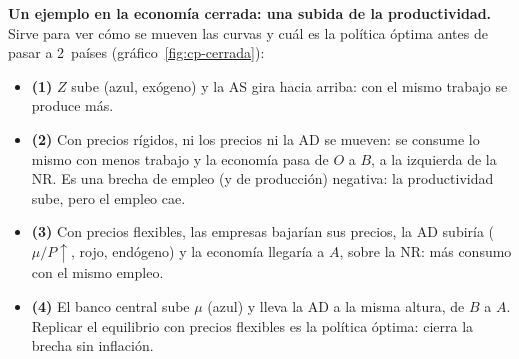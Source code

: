 \documentclass[11pt]{article}
\begin{document}
\begin{anotaciones}
\textbf{Un ejemplo en la economía cerrada: una subida de la productividad.} Sirve para ver cómo se mueven las curvas y cuál es la política óptima antes de pasar a 2~países (gráfico~\ref{fig:cp-cerrada}):
\begin{itemize}
\item \textbf{(1)} $Z$ sube (azul, exógeno) y la AS gira hacia arriba: con el mismo trabajo se produce más.
\item \textbf{(2)} Con precios rígidos, ni los precios ni la AD se mueven: se consume lo mismo con menos trabajo y la economía pasa de $O$ a $B$, a la izquierda de la NR. Es una brecha de empleo (y de producción) negativa: la productividad sube, pero el empleo cae.
\item \textbf{(3)} Con precios flexibles, las empresas bajarían sus precios, la AD subiría ($\mu/P\uparrow$, rojo, endógeno) y la economía llegaría a $A$, sobre la NR: más consumo con el mismo empleo.
\item \textbf{(4)} El banco central sube $\mu$ (azul) y lleva la AD a la misma altura, de $B$ a $A$. Replicar el equilibrio con precios flexibles es la política óptima: cierra la brecha sin inflación.
\end{itemize}
\begin{figuracaja}
\caption{ y : una subida de la productividad en la economía cerrada, con precios rígidos y flexibles, y la respuesta monetaria}\label{fig:cp-cerrada}
\end{figuracaja}
\end{anotaciones}
\end{document}

